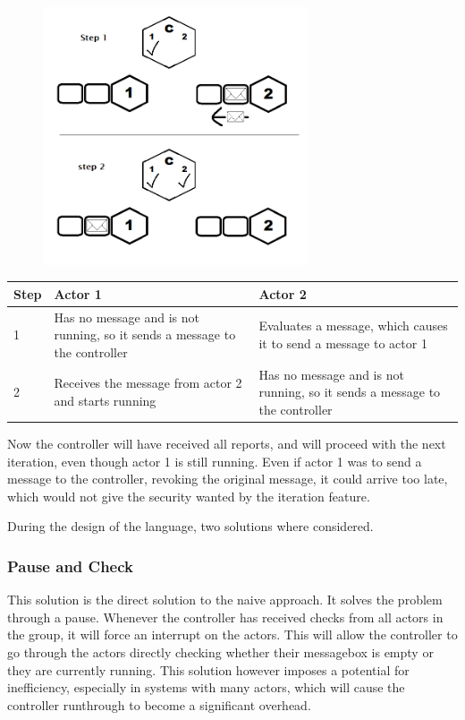 \begin{figure}[htbp]
\centering
\includegraphics[width=0.7\textwidth]{Analysis/Supercomputing/iterationproblem.png}\label{iterationproblem_img}
\end{figure}

\begin{tabular}{ | p{1cm} | p{6cm} | p{6cm} | }%
\hline
Step & Actor 1 & Actor 2 \\\hline
1 & Has no message and is not running, so it sends a message to the controller & Evaluates a message, which causes it to send a message to actor 1 \\\hline
2 & Receives the message from actor 2 and starts running & Has no message and is not running, so it sends a message to the controller \\\hline
\end{tabular}

Now the controller will have received all reports, and will proceed with the next iteration, even though actor 1 is still running. Even if actor 1 was to send a message to the controller, revoking the original message, it could arrive too late, which would not give the security wanted by the iteration feature.

During the design of the language, two solutions where considered.

\subsubsection{Pause and Check}

This solution is the direct solution to the naive approach. It solves the problem through a pause. Whenever the controller has received checks from all actors in the group, it will force an interrupt on the actors. This will allow the controller to go through the actors directly checking whether their messagebox is empty or they are currently running. This solution however imposes a potential for inefficiency, especially in systems with many actors, which will cause the controller runthrough to become a significant overhead.

